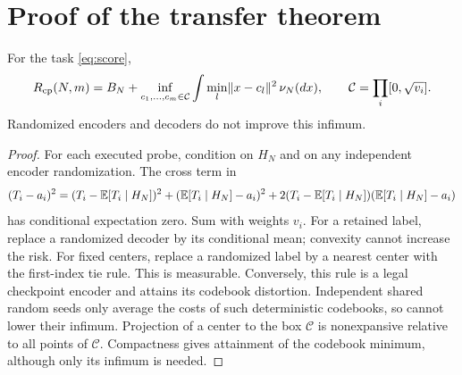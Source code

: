 \section{Proof of the transfer theorem}\label{sec:proof}
\begin{lemma}\label{lem:projection}
For the task \eqref{eq:score},
\begin{equation}\label{eq:projection}
 R_{\mathrm{cp}}(N,m)=B_N+
 \inf_{c_1,\ldots,c_m\in\mathcal C}\int\min_l\lVert x-c_l\rVert^2\,\nu_N(dx),
 \qquad \mathcal C=\prod_i[0,\sqrt{v_i}].
\end{equation}
Randomized encoders and decoders do not improve this infimum.
\end{lemma}
\begin{proof}
For each executed probe, condition on $H_N$ and on any independent encoder randomization. The cross term in
\[
 (T_i-a_i)^2=(T_i-\mathbb E[T_i\mid H_N])^2+
 (\mathbb E[T_i\mid H_N]-a_i)^2+
 2(T_i-\mathbb E[T_i\mid H_N])(\mathbb E[T_i\mid H_N]-a_i)
\]
has conditional expectation zero. Sum with weights $v_i$. For a retained label, replace a randomized decoder by its conditional mean; convexity cannot increase the risk. For fixed centers, replace a randomized label by a nearest center with the first-index tie rule. This is measurable. Conversely, this rule is a legal checkpoint encoder and attains its codebook distortion. Independent shared random seeds only average the costs of such deterministic codebooks, so cannot lower their infimum. Projection of a center to the box $\mathcal C$ is nonexpansive relative to all points of $\mathcal C$. Compactness gives attainment of the codebook minimum, although only its infimum is needed.
\end{proof}

